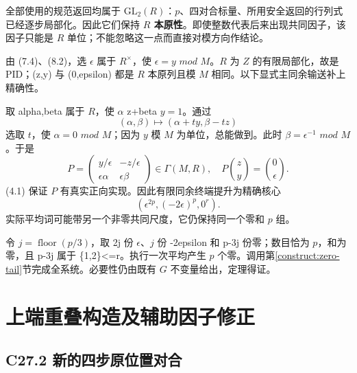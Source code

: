 \documentclass[11pt,a4paper]{article}
\theoremstyle{definition}
\numberwithin{equation}{section}
\begin{document}
{全部使用的规范返回均属于} {\ensuremath{\mathrm{GL}_{2}(R)}：\ensuremath{p}、四对合标量、所用安全返回的行列式已经逐步局部化。因此它们保持} \textbf{{\ensuremath{R}} {本原性}}{。即使整数代表后来出现共同因子，该因子只能是} {\ensuremath{R}} {单位；不能忽略这一点而直接对模方向作结论。}

{由} {(7.4)、(8.2)，选} {\ensuremath{\epsilon }} {属于} {\ensuremath{R^\times}，使} {\ensuremath{\epsilon =y}} {\ensuremath{mod}} {\ensuremath{M}。\ensuremath{R}} {为} {\ensuremath{Z}} {的有限局部化，故是} {PID；(z,y)} {与} {(0,epsilon)} {都是} {\ensuremath{R}} {本原列且模} {\ensuremath{M}} {相同。以下显式主同余输送补上精确性。}

{取} {alpha,beta} {属于} {\ensuremath{R}，使} {\ensuremath{\alpha }} {z+beta} {\ensuremath{y=1}。通过} \[
(\alpha,\beta)\mapsto(\alpha+ty,\beta-tz)
\] {选取} {\ensuremath{t}，使} {\ensuremath{\alpha =0}} {\ensuremath{mod}} {\ensuremath{M}；因为} {\ensuremath{y}} {模} {\ensuremath{M}} {为单位，总能做到。此时} {\ensuremath{\beta =\epsilon ^{-1}}} {\ensuremath{mod}} {\ensuremath{M}。于是} \[
P=\begin{pmatrix}
y/\epsilon&-z/\epsilon\\
\epsilon\alpha&\epsilon\beta
\end{pmatrix}
\in\Gamma(M,R),
\quad
P\binom zy=\binom0\epsilon.
\tag{C26.9.1}
\] {(4.1)} {保证} {\ensuremath{P}} {有真实正向实现。因此有限同余终端提升为精确核心} \[
(\epsilon^{2p},(-2\epsilon)^p,0^r).
\] {实际平均词可能带另一个非零共同尺度，它仍保持同一个零和} {\ensuremath{p}} {组。}

{令} {\ensuremath{j=\operatorname{floor}(p/3)}，取} {2j} {份} {\ensuremath{\epsilon }、\ensuremath{j}} {份} {-2epsilon} {和} {p-3j} {份零；数目恰为} {\ensuremath{p}，和为零，且} {p-3j} {属于} {\{1,2\}\textless=r。执行一次平均产生} {\ensuremath{p}} {个零。调用}第\ref{construct:zero-tail}节{完成全系统。必要性仍由既有} {\ensuremath{G}} {不变量给出，定理得证。}


\section{上端重叠构造及辅助因子修正}\label{construct:upper-overlap}
\subsection*{\texorpdfstring{{C27.2} {新的四步原位置对合}}{C27.2 新的四步原位置对合}}\label{C27-h168}
\end{document}
